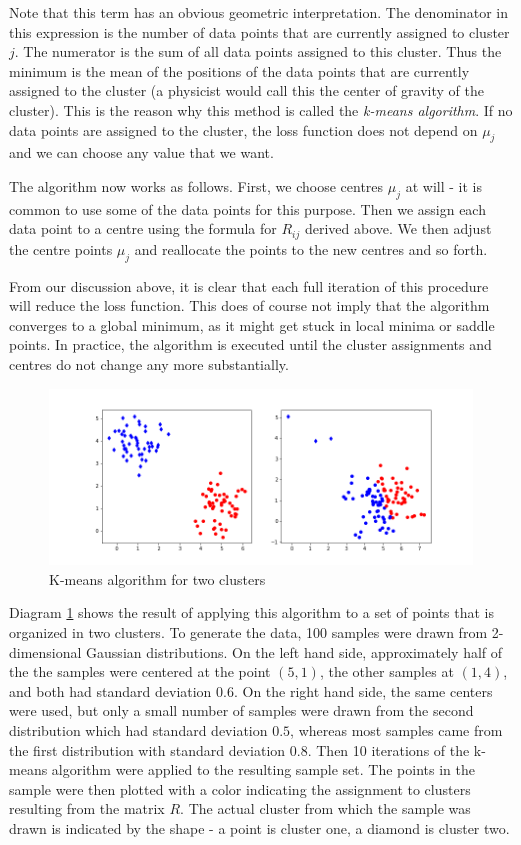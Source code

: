 \documentclass[a4paper, draft]{article}
\theoremstyle{own}
\theoremstyle{remark}
\begin{document}
Note that this term has an obvious geometric interpretation. The denominator in this expression is the number of data points that are currently assigned to cluster $j$. The numerator is the sum of all data points assigned to this cluster. Thus the minimum is the mean of the positions of the data points that are currently assigned to the cluster (a physicist would call this the center of gravity of the cluster). This is the reason why this method is called the {\em k-means algorithm}. If no data points are assigned to the cluster, the loss function does not depend on $\mu_j$ and we can choose any value that we want. 

The algorithm now works as follows. First, we choose centres $\mu_j$ at will - it is common to use some of the data points for this purpose. Then we assign each data point to a centre using the formula for $R_{ij}$ derived above. We then adjust the centre points $\mu_j$ and reallocate the points to the new centres and so forth. 

From our discussion above, it is clear that each full iteration of this procedure will reduce the loss function. This does of course not imply that the algorithm converges to a global minimum, as it might get stuck in local minima or saddle points. In practice, the algorithm is executed until the cluster assignments and centres do not change any more substantially. 

\begin{figure}[ht]
\centering
\includegraphics[width=1.0\linewidth]{KMeans}
\caption{K-means algorithm for two clusters}
\label{fig:KMeans}
\end{figure}

Diagram \ref{fig:KMeans} shows the result of applying this algorithm to a set of points that is organized in two clusters. To generate the data, 100 samples were drawn from 2-dimensional Gaussian distributions. On the left hand side, approximately half of the the samples were centered at the point $(5,1)$, the other samples at $(1,4)$, and both had standard deviation $0.6$. On the right hand side, the same centers were used, but only a small number of samples were drawn from the second distribution which had standard deviation $0.5$, whereas most samples came from the first distribution with standard deviation $0.8$. Then 10 iterations of the k-means algorithm were applied to the resulting sample set. The points in the sample were then plotted with a color indicating the assignment to clusters resulting from the matrix $R$. The actual cluster from which the sample was drawn is indicated by the shape - a point is cluster one, a diamond is cluster two.
\end{document}
